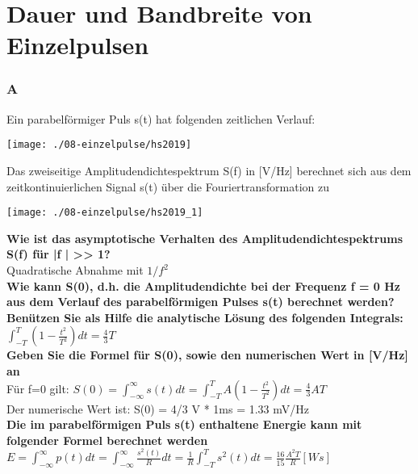 

\section{Dauer und Bandbreite von Einzelpulsen}

\subsubsection{A}
Ein parabelförmiger Puls s(t) hat folgenden zeitlichen Verlauf:
\begin{center}
    \vspace{-8pt}
    \texttt{[image: ./08-einzelpulse/hs2019]}
    \vspace{-8pt}
\end{center}

Das zweiseitige Amplitudendichtespektrum S(f) in [V/Hz] berechnet sich aus dem zeitkontinuierlichen Signal s(t) über die Fouriertransformation zu
\begin{center}
    \vspace{-8pt}
    \texttt{[image: ./08-einzelpulse/hs2019\_1]}
    \vspace{-8pt}
\end{center}

\textbf{Wie ist das asymptotische Verhalten des Amplitudendichtespektrums S(f) für |f | >> 1?}\\
Quadratische Abnahme mit $1/f^2$\\

\textbf{Wie kann S(0), d.h. die Amplitudendichte bei der Frequenz f = 0 Hz aus dem Verlauf des parabelförmigen Pulses s(t) berechnet werden? Benützen Sie als Hilfe die analytische
Lösung des folgenden Integrals:}\\
$\int_{-T}^{T} (1-\frac{t^2}{T^2})dt=\frac{4}{3}T$\\

\textbf{Geben Sie die Formel für S(0), sowie den numerischen Wert in [V/Hz] an}\\
Für f=0 gilt: $S(0)=\int_{-\infty}^{\infty}s(t)dt=\int_{-T}^{T}A(1-\frac{t^2}{T^2})dt=\frac{4}{3}AT$\\
Der numerische Wert ist: S(0) = 4/3 V * 1ms = 1.33 mV/Hz\\

\textbf{Die im parabelförmigen Puls s(t) enthaltene Energie kann mit folgender Formel berechnet werden}\\
$E=\int_{-\infty}^{\infty}p(t)dt=\int_{-\infty}^{\infty}\frac{s^2(t)}{R}dt=\frac{1}{R}\int_{-T}^{T}s^2(t)dt=\frac{16}{15}\frac{A^2T}{R} [Ws]$\\

